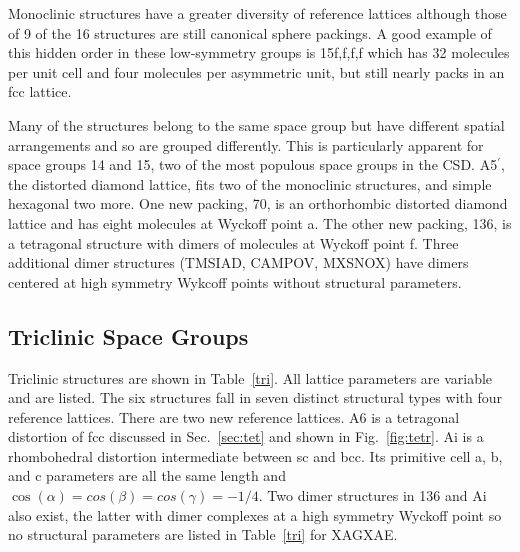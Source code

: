 \documentclass[preprint]{iucr}              %
\begin{document}
Monoclinic structures have a greater diversity of reference lattices
although those of 9 of the 16 structures are still canonical sphere
packings. A good example of this hidden order in these low-symmetry
groups is 15f,f,f,f which has 32 molecules per unit cell and four
molecules per asymmetric unit, but still nearly packs in an fcc
lattice.

Many of the structures belong to the same space group but have
different spatial arrangements and so are grouped differently. This
is particularly apparent for space groups 14 and 15, two of the most
populous space groups in the CSD. A5$^\prime$, the distorted diamond
lattice, fits two of the monoclinic structures, and simple hexagonal
two more.  One new packing, 70, is an orthorhombic distorted diamond
lattice and has eight molecules at Wyckoff point a. The other new
packing, 136, is a tetragonal structure with dimers of molecules at
Wyckoff point f. Three additional dimer structures (TMSIAD, CAMPOV,
MXSNOX) have dimers centered at high symmetry Wykcoff points without
structural parameters.

\subsection{Triclinic Space Groups}

Triclinic structures are shown in Table~\ref{tri}. All lattice
parameters are variable and are listed.  The six structures fall in
seven distinct structural types with four reference lattices. There
are two new reference lattices. A6 is a tetragonal distortion of fcc
discussed in Sec.~\ref{sec:tet} and shown in Fig.~\ref{fig:tetr}. Ai
is a rhombohedral distortion intermediate between sc and bcc. Its
primitive cell a, b, and c parameters are all the same length and
$\cos(\alpha)=cos(\beta)=cos(\gamma)=-1/4$. Two dimer structures in
136 and Ai also exist, the latter with dimer complexes at a high
symmetry Wyckoff point so no structural parameters are listed in
Table~\ref{tri} for XAGXAE.
\end{document}
